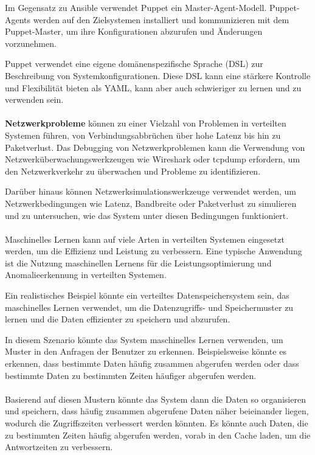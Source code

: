 \documentclass[../vs-script-first-v01.tex]{subfiles}
\begin{document}
Im Gegensatz zu Ansible verwendet Puppet ein Master-Agent-Modell. Puppet-Agents werden auf den Zielsystemen installiert und kommunizieren mit dem Puppet-Master, um ihre Konfigurationen abzurufen und Änderungen vorzunehmen.

Puppet verwendet eine eigene domänenspezifische Sprache (DSL) zur Beschreibung von Systemkonfigurationen. Diese DSL kann eine stärkere Kontrolle und Flexibilität bieten als YAML, kann aber auch schwieriger zu lernen und zu verwenden sein.
\\\\
\textbf{Netzwerkprobleme} können zu einer Vielzahl von Problemen in verteilten Systemen führen, von Verbindungsabbrüchen über hohe Latenz bis hin zu Paketverlust. Das Debugging von Netzwerkproblemen kann die Verwendung von Netzwerküberwachungswerkzeugen wie Wireshark oder tcpdump erfordern, um den Netzwerkverkehr zu überwachen und Probleme zu identifizieren.

Darüber hinaus können Netzwerksimulationswerkzeuge verwendet werden, um Netzwerkbedingungen wie Latenz, Bandbreite oder Paketverlust zu simulieren und zu untersuchen, wie das System unter diesen Bedingungen funktioniert.
\\\\
Maschinelles Lernen kann auf viele Arten in verteilten Systemen eingesetzt werden, um die Effizienz und Leistung zu verbessern. Eine typische Anwendung ist die Nutzung maschinellen Lernens für die Leistungsoptimierung und Anomalieerkennung in verteilten Systemen.

Ein realistisches Beispiel könnte ein verteiltes Datenspeichersystem sein, das maschinelles Lernen verwendet, um die Datenzugriffs- und Speichermuster zu lernen und die Daten effizienter zu speichern und abzurufen.

In diesem Szenario könnte das System maschinelles Lernen verwenden, um Muster in den Anfragen der Benutzer zu erkennen. Beispielsweise könnte es erkennen, dass bestimmte Daten häufig zusammen abgerufen werden oder dass bestimmte Daten zu bestimmten Zeiten häufiger abgerufen werden.
\\\\
Basierend auf diesen Mustern könnte das System dann die Daten so organisieren und speichern, dass häufig zusammen abgerufene Daten näher beieinander liegen, wodurch die Zugriffszeiten verbessert werden könnten. Es könnte auch Daten, die zu bestimmten Zeiten häufig abgerufen werden, vorab in den Cache laden, um die Antwortzeiten zu verbessern.
\end{document}
